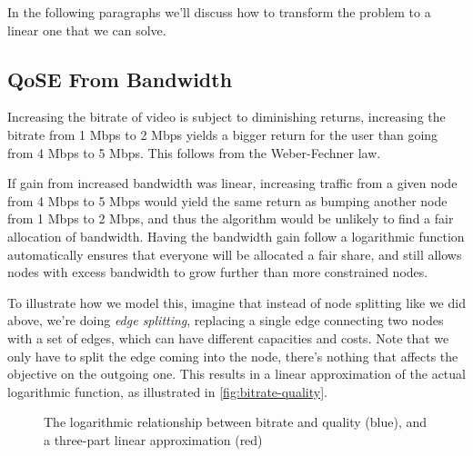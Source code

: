 In the following paragraphs we'll discuss how to transform the problem to a linear one that we can solve.


\subsection{QoSE From Bandwidth}

Increasing the bitrate of video is subject to diminishing returns, increasing the bitrate from 1 Mbps to 2 Mbps yields a bigger return for the user than going from 4 Mbps to 5 Mbps. This follows from the Weber-Fechner law.

If gain from increased bandwidth was linear, increasing traffic from a given node from 4 Mbps to 5 Mbps would yield the same return as bumping another node from 1 Mbps to 2 Mbps, and thus the algorithm would be unlikely to find a fair allocation of bandwidth. Having the bandwidth gain follow a logarithmic function automatically ensures that everyone will be allocated a fair share, and still allows nodes with excess bandwidth to grow further than more constrained nodes.

To illustrate how we model this, imagine that instead of node splitting like we did above, we're doing \emph{edge splitting}, replacing a single edge connecting two nodes with a set of edges, which can have different capacities and costs. Note that we only have to split the edge coming into the node, there's nothing that affects the objective on the outgoing one. This results in a linear approximation of the actual logarithmic function, as illustrated in \autoref{fig:bitrate-quality}.

\begin{figure}
    \centering


    \caption{The logarithmic relationship between bitrate and quality (blue), and a three-part linear approximation (red)}
    \label{fig:bitrate-quality}
\end{figure}

